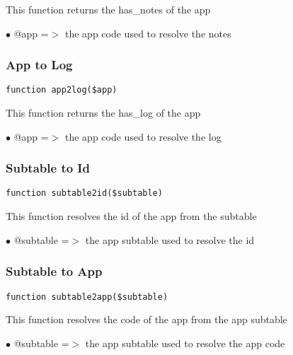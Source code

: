 \documentclass[a4paper]{article}
\begin{document}
This function returns the has\_notes of the app

\begin{compactitem}
\item[\color{myblue}$\bullet$] @app =$>$ the app code used to resolve the notes
\end{compactitem}

\hypertarget{toc33}{}
\subsubsection{App to Log}

\begin{lstlisting}
function app2log($app)
\end{lstlisting}

This function returns the has\_log of the app

\begin{compactitem}
\item[\color{myblue}$\bullet$] @app =$>$ the app code used to resolve the log
\end{compactitem}

\hypertarget{toc34}{}
\subsubsection{Subtable to Id}

\begin{lstlisting}
function subtable2id($subtable)
\end{lstlisting}

This function resolves the id of the app from the subtable

\begin{compactitem}
\item[\color{myblue}$\bullet$] @subtable =$>$ the app subtable used to resolve the id
\end{compactitem}

\hypertarget{toc35}{}
\subsubsection{Subtable to App}

\begin{lstlisting}
function subtable2app($subtable)
\end{lstlisting}

This function resolves the code of the app from the app subtable

\begin{compactitem}
\item[\color{myblue}$\bullet$] @subtable =$>$ the app subtable used to resolve the app code
\end{compactitem}
\end{document}
